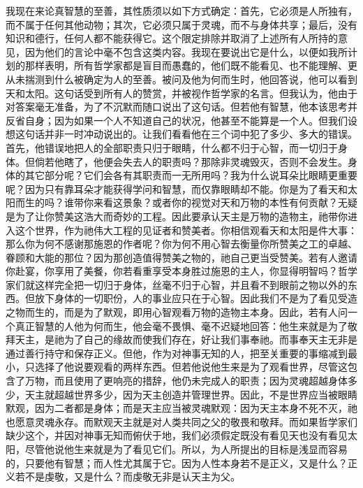 我现在来论真智慧的至善，其性质须以如下方式确定：首先，它必须是人所独有，而不属于任何其他动物；其次，它必须只属于灵魂，而不与身体共享；最后，没有知识和德行，任何人都不能获得它。这个限定排除并取消了上述所有人所持的意见，因为他们的言论中毫不包含这类内容。我现在要说出它是什么，以便如我所计划的那样表明，所有哲学家都是盲目而愚蠢的，他们既不能看见、也不能理解、更从未揣测到什么被确定为人的至善。被问及他为何而生时，他回答说，他可以看到天和太阳。这句话受到所有人的赞赏，并被视作哲学家的名言。但我认为，他由于对答案毫无准备，为了不沉默而随口说出了这句话。但若他有智慧，他本该思考并反省自身；因为如果一个人不知道自己的状况，他甚至不能算是一个人。但我们设想这句话并非一时冲动说出的。让我们看看他在三个词中犯了多少、多大的错误。首先，他错误地把人的全部职责只归于眼睛，什么都不归于心智，而一切归于身体。但倘若他瞎了，他便会失去人的职责吗？那除非灵魂毁灭，否则不会发生。身体的其它部分呢？它们会各有其职责而一无所用吗？我为什么说耳朵比眼睛更重要呢？因为只有靠耳朵才能获得学问和智慧，而仅靠眼睛却不能。你是为了看天和太阳而生的吗？谁带你来看这景象？或者你的视觉对天和万物的本性有何贡献？无疑是为了让你赞美这浩大而奇妙的工程。因此要承认天主是万物的造物主，祂带你进入这个世界，作为祂伟大工程的见证者和赞美者。你相信观看天和太阳是件大事：那么你为何不感谢那施恩的作者呢？你为何不用心智去衡量你所赞美之工的卓越、眷顾和大能的那位？因为那创造值得赞美之物的，祂自己更当受赞美。若有人邀请你赴宴，你享用了美餐，你若看重享受本身胜过施恩的主人，你显得明智吗？哲学家们就这样完全把一切归于身体，丝毫不归于心智，并且看不到眼前之物以外的东西。但放下身体的一切职份，人的事业应只在于心智。因此我们不是为了看见受造之物而生的，而是为了默观，即用心智观看万物的造物主本身。因此，若有人问一个真正智慧的人他为何而生，他会毫不畏惧、毫不迟疑地回答：他生来就是为了敬拜天主，是祂为了自己的缘故而使我们存在，好让我们事奉祂。而事奉天主无非是通过善行持守和保存正义。但他，作为对神事无知的人，把至关重要的事缩减到最小，只选择了他说要观看的两样东西。但若他说他生来是为了观看世界，尽管这包含了万物，而且使用了更响亮的措辞，他仍未完成人的职责；因为灵魂超越身体多少，天主就超越世界多少，因为天主创造并管理世界。因此，不是世界应当被眼睛默观，因为二者都是身体；而是天主应当被灵魂默观：因为天主本身不死不灭，祂也愿意灵魂永存。而默观天主就是对人类共同之父的敬畏和敬拜。而如果哲学家们缺少这个，并因对神事无知而俯伏于地，我们必须假定既没有看见天也没有看见太阳，尽管他说他生来就是为了看见它们。所以，为人所提出的目标是浅显而容易的，只要他有智慧；而人性尤其属于它。因为人性本身若不是正义，又是什么？正义若不是虔敬，又是什么？而虔敬无非是认天主为父。\par

